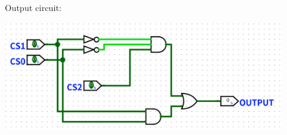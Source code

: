 \documentclass[a4paper]{article}
\begin{document}
\begin{answer}[Question 3]
    Output circuit:
    \begin{center}
        \includegraphics[width=0.9\textwidth]{calc_out.png}
    \end{center}
        
\end{answer}
\end{document}
